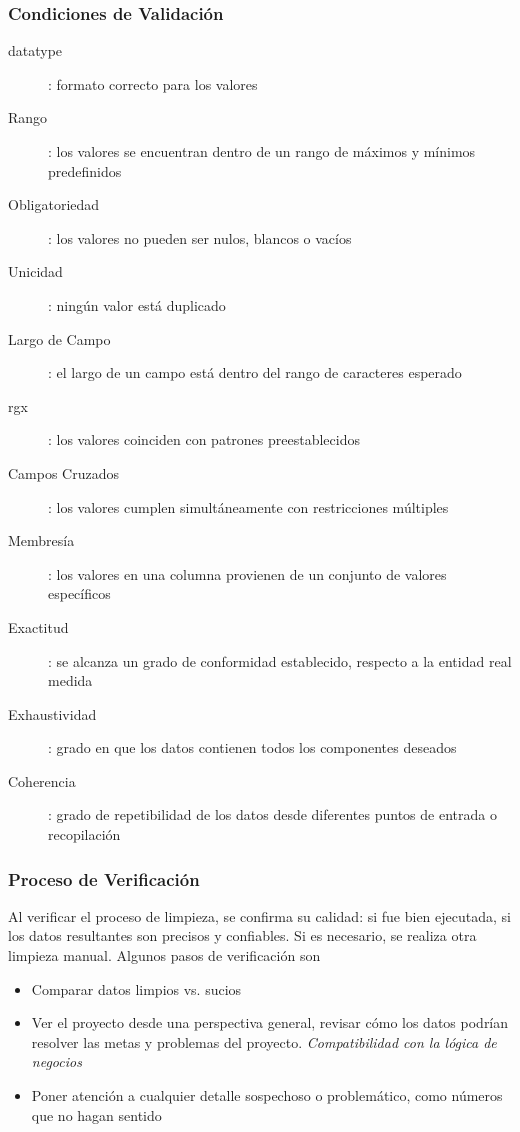 \subsubsection{Condiciones de Validación}
\begin{description}
    \item [\gls{datatype}]{: formato correcto para los valores}
    \item [Rango]{: los valores se encuentran dentro de un rango de máximos y mínimos predefinidos}
    \item [Obligatoriedad]{: los valores no pueden ser nulos, blancos o vacíos}
    \item [Unicidad]{: ningún valor está duplicado}
    \item [Largo de Campo]{: el largo de un campo está dentro del rango de caracteres esperado}
    \item [\gls{rgx}]{: los valores coinciden con patrones preestablecidos}
    \item [Campos Cruzados]{: los valores cumplen simultáneamente con restricciones múltiples}
    \item [Membresía]{: los valores en una columna provienen de un conjunto de valores específicos} 
    \item [Exactitud]{: se alcanza un grado de conformidad establecido, respecto a la entidad real medida}
    \item [Exhaustividad]{: grado en que los datos contienen todos los componentes deseados}
    \item [Coherencia]{: grado de repetibilidad de los datos desde diferentes puntos de entrada o recopilación}
\end{description}

\subsubsection{Proceso de Verificación}
Al verificar el proceso de limpieza, se confirma su calidad: si fue bien ejecutada, si los datos resultantes son precisos y confiables. Si es necesario, se realiza otra limpieza manual. Algunos pasos de verificación son
\begin{itemize}
    \item {Comparar datos limpios vs. sucios}
    \item {Ver el proyecto desde una perspectiva general, revisar cómo los datos podrían resolver las metas y problemas del proyecto. \textit{Compatibilidad con la lógica de negocios}}
    \item {Poner atención a cualquier detalle sospechoso o problemático, como números que no hagan sentido}
\end{itemize}


